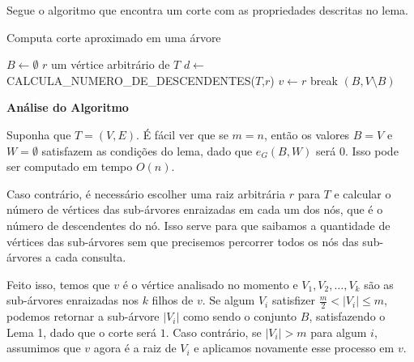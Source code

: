 \documentclass[a4paper,12pt]{article}
\begin{document}
Segue o algoritmo que encontra um corte com as propriedades descritas
no lema.

\medskip

\begin{algorithm}[H]

	\caption{Computa corte aproximado em uma árvore}
	$B \gets \emptyset$\;
	{
		$r$ um vértice arbitrário de $T$\;
		$d \gets $ CALCULA\_NUMERO\_DE\_DESCENDENTES($T$,$r$)\;
		$v \gets r$\;
		{
		{
			{
				break\;
			}
		}
		}
	}
	\Return $(B,V\setminus B)$

\end{algorithm}	

\bigskip
\bigskip

\textbf{Análise do Algoritmo}

	Suponha que $T=(V,E)$.
	É fácil ver que se $m=n$, então os valores $B = V$ e $W = \emptyset$ 
	satisfazem as condições do lema, dado que $e_G(B,W)$ será $0$. 
	Isso pode ser computado em tempo $O(n)$.

	Caso contrário, é necessário escolher uma raiz arbitrária $r$ para $T$
	e calcular o número de vértices das sub-árvores enraizadas 
	em cada um dos nós, que é o número de descendentes do nó.
	Isso serve para que saibamos a quantidade de vértices das sub-árvores
	sem que precisemos percorrer todos os nós das sub-árvores a cada consulta.

	Feito isso, temos que $v$ é o vértice analisado no momento e 
	$V_1, V_2, \ldots, V_k$ são as sub-árvores enraizadas nos $k$ filhos
	de $v$.
	Se algum $V_i$ satisfizer $\frac{m}{2}<|V_i|\le m$, podemos retornar
	a sub-árvore $|V_i|$ como sendo o conjunto $B$, satisfazendo o Lema 1,
	dado que o corte será $1$.
	Caso contrário, se $|V_i|> m$ para algum $i$, assumimos que 
	$v$ agora é a raiz de $V_i$ e aplicamos novamente esse processo em $v$.
\end{document}
